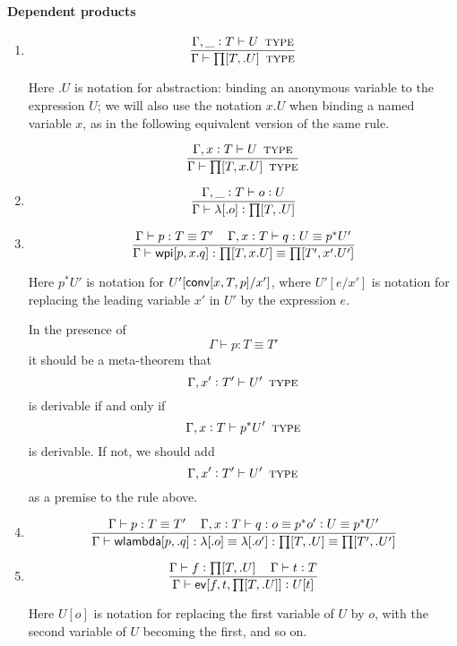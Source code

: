 \documentclass[11pt]{article}
\newcommand{\eqd}{\equiv}
\newcommand\spc{{\,\,\,\,\,\,\,}}
\newcommand{\ccolon}{\vcentcolon}
\newcommand{\ccheck}{\vcentcolon}            %
\newcommand{\csynth}{\vcentcolon\vcentcolon} %
\renewcommand{\csynth}{\ccheck}              %
\newcommand{\Type}{\mathop{\text{ \sc type}}}
\newcommand{\ha}[2]{#1[#2]}
\newcommand{\annot}{{\sf annot}}
\newcommand{\haa}[2]{\ha\annot{#1,#2}}
\renewcommand{\haa}[2]{#1}
\newcommand{\conv}{{\sf conv}}
\newcommand{\ev}{{\sf ev}}
\newcommand{\wlambda}{{\sf wlambda}}
\newcommand{\wpieq}{{\sf wpi}}
\newcommand{\var}{\char`_}
\begin{document}
\paragraph{Dependent products}

\begin{enumerate}

\item 
\[\frac{ \Gamma, \var \ccolon T \vdash U\Type  }{\Gamma \vdash \ha\prod{T,.U}\Type}\]

Here $.U$ is notation for abstraction: binding an anonymous variable to the
expression $U$; we will also use the notation $x.U$ when binding a named
variable $x$, as in the following equivalent version of the same rule.

\[\frac{ \Gamma, x \ccolon T \vdash U\Type  }
       {\Gamma \vdash \ha\prod{T,x.U}\Type}\]

\item 
\[\frac{
  \Gamma, \var \ccolon T \vdash o \ccheck{U}
}{\Gamma \vdash \ha\lambda{.o} \ccheck{\ha\prod{T,.U}}}
\]

\item 
\[ \frac{ 
  \Gamma \vdash p:T \eqd T'  \spc
  \Gamma,  x \ccolon T \vdash q:U \eqd p^*U' 
  } {
  \Gamma \vdash \ha\wpieq{p,x.q}:\ha\prod{T,x.U}\eqd \ha\prod{T',x'.U'}
}\]

Here ${p}^*U'$ is notation for $U'[\haa {\ha\conv{x,T,p}} {T'}/x']$, where
$U'[e/x']$ is notation for replacing the leading variable $x'$ in $U'$ by the
expression $e$.

In the presence of $$\Gamma \vdash p:T \eqd T'  $$ it should be a
meta-theorem that $$\Gamma, x' \ccolon T' \vdash U' \Type $$ is
derivable if and only if $$\Gamma, x \ccolon T \vdash p^* U' \Type
$$ is derivable.  If not, we should add
$$  \Gamma, x' \ccolon T' \vdash U'  \Type  $$
as a premise to the rule above.

\item 
\[ \frac{ 
  \Gamma \vdash p:T \eqd T'  \spc
  \Gamma,  x \ccolon T \vdash q:o \eqd p^* o' \ccolon U \eqd p^*U'
  } {
  \Gamma \vdash \ha\wlambda{p,.q} : \ha\lambda{.o}\eqd \ha\lambda{.o'} : \ha\prod{T,.U} \eqd \ha\prod{T',.U'}
}\]

\item 
\[\frac{
  \Gamma \vdash f \ccheck{\ha\prod{T,.U}}
  \spc 
  \Gamma \vdash t \ccheck{T}
}{
  \Gamma \vdash \ha \ev{f,t,{\ha\prod{T,.U}}} \csynth U[\haa t T] 
}\]

Here $U[o]$ is notation for replacing the first variable of $U$ by $o$, with
the second variable of $U$ becoming the first, and so on.  


\end{enumerate}
\end{document}
